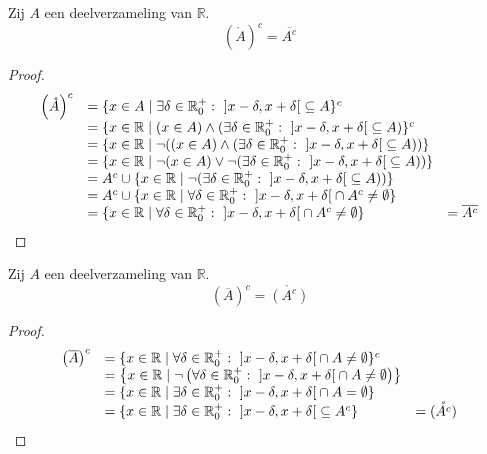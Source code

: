 \documentclass[main.tex]{subfiles}
\begin{document}
\begin{st}
  Zij $A$ een deelverzameling van $\mathbb{R}$.
  \[ \left(\mathring{A}\right)^{c} = \overline{A^{c}} \]
  
  \begin{proof}
    \[
    \begin{array}{rll}
      \left(\mathring{A}\right)^{c}
      &= \{ x\in A\mid \exists \delta \in \mathbb{R}_{0}^{+}:\ \interval[open]{x-\delta}{x+\delta} \subseteq A \}^{c}\\
      &= \{ x\in \mathbb{R}\mid (x\in A) \wedge (\exists \delta \in \mathbb{R}_{0}^{+}:\ \interval[open]{x-\delta}{x+\delta} \subseteq A) \}^{c}\\
      &= \{ x\in \mathbb{R}\mid \neg((x\in A) \wedge (\exists \delta \in \mathbb{R}_{0}^{+}:\ \interval[open]{x-\delta}{x+\delta} \subseteq A)) \}\\
      &= \{ x\in \mathbb{R}\mid \neg(x\in A) \vee \neg(\exists \delta \in \mathbb{R}_{0}^{+}:\ \interval[open]{x-\delta}{x+\delta} \subseteq A)) \}\\
      &= A^{c} \cup \{ x\in \mathbb{R} \mid \neg(\exists \delta \in \mathbb{R}_{0}^{+}:\ \interval[open]{x-\delta}{x+\delta} \subseteq A)) \}\\
      &= A^{c} \cup \{ x\in \mathbb{R} \mid \forall \delta \in \mathbb{R}_{0}^{+}:\ \interval[open]{x-\delta}{x+\delta} \cap A^{c} \neq \emptyset \} \\
      &= \{ x\in \mathbb{R} \mid \forall \delta \in \mathbb{R}_{0}^{+}:\ \interval[open]{x-\delta}{ x+\delta} \cap A^{c} \neq \emptyset \}
      &= \overline{A^{c}}\\
    \end{array}
    \]
  \end{proof}
\feed
\end{st}

\begin{st}
  Zij $A$ een deelverzameling van $\mathbb{R}$.
  \[ \left(\overline{A}\right)^{c} = \mathring{\left(A^{c}\right)} \]

  \begin{proof}
    \[
    \begin{array}{rll}
      \left(\overline{A}\right)^{c}
      &= \{ x\in \mathbb{R} \mid \forall \delta \in \mathbb{R}_{0}^{+}:\ \interval[open]{x-\delta}{ x+\delta} \cap A \neq \emptyset \}^{c}\\
      &= \left\{ x\in \mathbb{R} \mid \neg\left(\forall \delta \in \mathbb{R}_{0}^{+}:\ \interval[open]{x-\delta}{ x+\delta} \cap A \neq \emptyset \right) \right\}\\
      &= \{ x\in \mathbb{R} \mid \exists \delta \in \mathbb{R}_{0}^{+}:\ \interval[open]{x-\delta}{ x+\delta} \cap A = \emptyset \}\\
      &= \{ x\in \mathbb{R} \mid \exists \delta \in \mathbb{R}_{0}^{+}:\ \interval[open]{x-\delta}{ x+\delta} \subseteq A^{c} \}
      &= \mathring{\left(A^{c}\right)}\\
    \end{array}
    \]
  \end{proof}
\feed
{}
\end{st}
\end{document}
